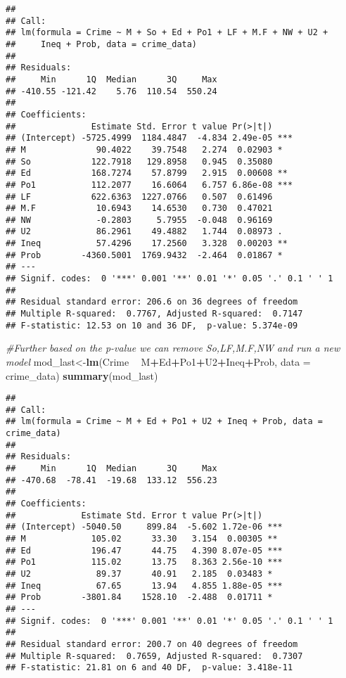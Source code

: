 \documentclass[
]{article}
\newenvironment{Shaded}{\begin{snugshade}}{\end{snugshade}}
\newcommand{\CommentTok}[1]{\textcolor[rgb]{0.56,0.35,0.01}{\textit{#1}}}
\newcommand{\DataTypeTok}[1]{\textcolor[rgb]{0.13,0.29,0.53}{#1}}
\newcommand{\KeywordTok}[1]{\textcolor[rgb]{0.13,0.29,0.53}{\textbf{#1}}}
\newcommand{\NormalTok}[1]{#1}
\newcommand{\OperatorTok}[1]{\textcolor[rgb]{0.81,0.36,0.00}{\textbf{#1}}}
\newcommand{\StringTok}[1]{\textcolor[rgb]{0.31,0.60,0.02}{#1}}
\begin{document}
\begin{verbatim}
## 
## Call:
## lm(formula = Crime ~ M + So + Ed + Po1 + LF + M.F + NW + U2 + 
##     Ineq + Prob, data = crime_data)
## 
## Residuals:
##     Min      1Q  Median      3Q     Max 
## -410.55 -121.42    5.76  110.54  550.24 
## 
## Coefficients:
##               Estimate Std. Error t value Pr(>|t|)    
## (Intercept) -5725.4999  1184.4847  -4.834 2.49e-05 ***
## M              90.4022    39.7548   2.274  0.02903 *  
## So            122.7918   129.8958   0.945  0.35080    
## Ed            168.7274    57.8799   2.915  0.00608 ** 
## Po1           112.2077    16.6064   6.757 6.86e-08 ***
## LF            622.6363  1227.0766   0.507  0.61496    
## M.F            10.6943    14.6530   0.730  0.47021    
## NW             -0.2803     5.7955  -0.048  0.96169    
## U2             86.2961    49.4882   1.744  0.08973 .  
## Ineq           57.4296    17.2560   3.328  0.00203 ** 
## Prob        -4360.5001  1769.9432  -2.464  0.01867 *  
## ---
## Signif. codes:  0 '***' 0.001 '**' 0.01 '*' 0.05 '.' 0.1 ' ' 1
## 
## Residual standard error: 206.6 on 36 degrees of freedom
## Multiple R-squared:  0.7767, Adjusted R-squared:  0.7147 
## F-statistic: 12.53 on 10 and 36 DF,  p-value: 5.374e-09
\end{verbatim}

\begin{Shaded}
\begin{Highlighting}[]
\CommentTok{#Further based on the p-value we can remove So,LF,M.F,NW and run a new model}
\NormalTok{mod_last<-}\KeywordTok{lm}\NormalTok{(Crime }\OperatorTok{~}\StringTok{ }\NormalTok{M}\OperatorTok{+}\NormalTok{Ed}\OperatorTok{+}\NormalTok{Po1}\OperatorTok{+}\NormalTok{U2}\OperatorTok{+}\NormalTok{Ineq}\OperatorTok{+}\NormalTok{Prob, }
        \DataTypeTok{data =}\NormalTok{ crime_data)}
\KeywordTok{summary}\NormalTok{(mod_last)}
\end{Highlighting}
\end{Shaded}

\begin{verbatim}
## 
## Call:
## lm(formula = Crime ~ M + Ed + Po1 + U2 + Ineq + Prob, data = crime_data)
## 
## Residuals:
##     Min      1Q  Median      3Q     Max 
## -470.68  -78.41  -19.68  133.12  556.23 
## 
## Coefficients:
##             Estimate Std. Error t value Pr(>|t|)    
## (Intercept) -5040.50     899.84  -5.602 1.72e-06 ***
## M             105.02      33.30   3.154  0.00305 ** 
## Ed            196.47      44.75   4.390 8.07e-05 ***
## Po1           115.02      13.75   8.363 2.56e-10 ***
## U2             89.37      40.91   2.185  0.03483 *  
## Ineq           67.65      13.94   4.855 1.88e-05 ***
## Prob        -3801.84    1528.10  -2.488  0.01711 *  
## ---
## Signif. codes:  0 '***' 0.001 '**' 0.01 '*' 0.05 '.' 0.1 ' ' 1
## 
## Residual standard error: 200.7 on 40 degrees of freedom
## Multiple R-squared:  0.7659, Adjusted R-squared:  0.7307 
## F-statistic: 21.81 on 6 and 40 DF,  p-value: 3.418e-11
\end{verbatim}
\end{document}

